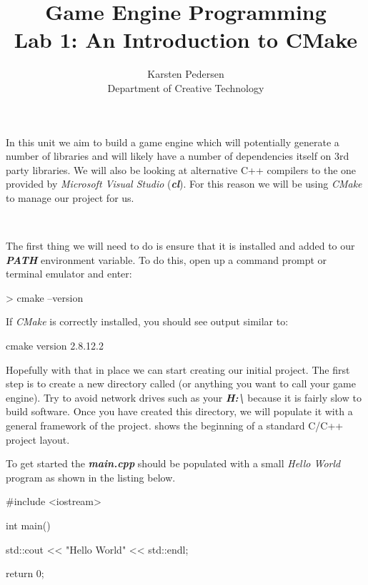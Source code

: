 \documentclass[10pt]{article}
\begin{document}
\title{Game Engine Programming \\
  \large Lab 1: An Introduction to CMake}

\author{Karsten Pedersen\\ Department of Creative Technology}
\maketitle

In this unit we aim to build a game engine which will potentially generate
a number of libraries and will likely have a number of dependencies
itself on 3rd party libraries. We will also be looking at alternative
C++ compilers to the one provided by \textit{Microsoft Visual Studio}
(\textbf{\textit{cl}}). For this reason we will be using \textit{CMake}
to manage our project for us.

\

The first thing we will need to do is ensure that it is installed and
added to our \textbf{\textit{PATH}} environment variable.  To do this,
open up a command prompt or terminal emulator and enter:

\begin{Code}
  > cmake --version
\end{Code}

If \textit{CMake} is correctly installed, you should see output similar to:

\begin{Code}
  cmake version 2.8.12.2
\end{Code}

Hopefully with that in place we can start creating our initial
project. The first step is to create a new directory called
 (or anything you want to call your game engine). Try
to avoid network drives such as your \textbf{\textit{H:\textbackslash}}
because it is fairly slow to build software. Once you have created
this directory, we will populate it with a general framework of the
project.  shows the beginning of a standard C/C++ project
layout.


To get started the \textbf{\textit{main.cpp}} should be populated with a small \textit{Hello World} program as shown in the listing below.

\begin{Code}
  #include <iostream>

  int main()
  {
    std::cout << "Hello World" << std::endl;

    return 0;
  }
\end{Code}
\end{document}
